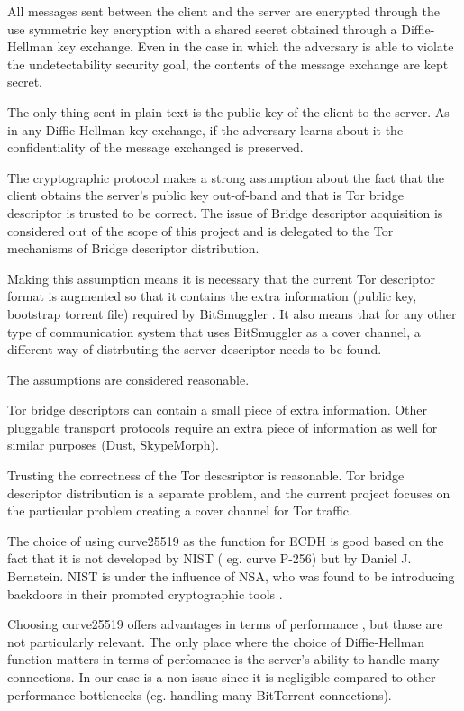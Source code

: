 \documentclass[11pt]{book} %
\newcommand{\projectName}{BitSmuggler }
\begin{document}
All messages sent between the client and the server are encrypted through the use symmetric key encryption with a shared secret obtained through a Diffie-Hellman key exchange. Even in the case in which the adversary is able to violate the undetectability security goal, the contents of the message exchange are kept secret.

The only thing sent in plain-text is the public key of the client to the server. As in any Diffie-Hellman key exchange, if the adversary learns about it the confidentiality of the message exchanged is preserved.



The cryptographic protocol makes a strong assumption about the fact that the client obtains the server's public key out-of-band and that is Tor bridge descriptor is trusted to be correct. The issue of Bridge descriptor acquisition is considered out of the scope of this project and is delegated to the Tor mechanisms of Bridge descriptor distribution.

Making this assumption means it is necessary that the current Tor descriptor format is augmented so that it contains the extra information (public key, bootstrap torrent file) required by  \projectName . It also means that for any other type of communication system that uses \projectName as a cover channel, a different way of distrbuting the server descriptor needs to be found.

The assumptions are considered reasonable.

Tor bridge descriptors can contain a small piece of extra information. Other pluggable transport protocols require an extra piece of information as well for similar purposes (Dust, SkypeMorph).

Trusting the correctness of the Tor descsriptor is reasonable. Tor bridge descriptor distribution is a separate problem, and the current project focuses on the particular problem creating a cover channel for Tor traffic.


The choice of using curve25519 as the function for ECDH is good based on the fact that it is not developed by NIST ( eg. curve P-256) but by Daniel J. Bernstein. NIST is under the influence of NSA, who was found to be introducing backdoors in their promoted cryptographic tools \citep*{web:nsaBackdoor}.

Choosing curve25519 offers advantages in terms of performance \citep*{web:curve25519}, but those are not particularly relevant. The only place where the choice of Diffie-Hellman function matters in terms of perfomance is the server's ability to handle many connections. In our case is a non-issue since it is negligible compared to other performance bottlenecks (eg. handling many BitTorrent connections).
\end{document}
